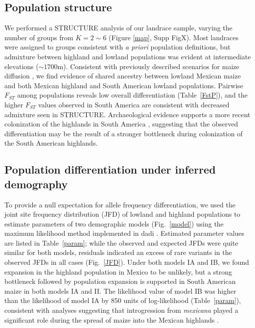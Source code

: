 \subsection*{Population structure}

We performed a {\sf STRUCTURE} analysis \citep{Pritchard_2000_10835412,Falush_2003_12930761} of our landrace sample, varying the number of groups from $K=2\sim 6$ (Figure \ref{map}, Supp FigX). 
Most landraces were assigned to groups consistent with \emph{a priori} population definitions, but admixture between highland and lowland populations was evident at intermediate elevations ($\sim1700$m).  Consistent with previously described scenarios for maize diffusion \citep{Piperno_2006_69}, we find evidence of shared ancestry between lowland Mexican maize and both Mexican highland and South American lowland populations.  Pairwise $F_{ST}$ among populations reveals low overall differentiation (Table~\ref{FstP}), and the higher $F_{ST}$ values observed in South America are consistent with decreased admixture seen in STRUCTURE.  Archaeological evidence supports a more recent colonization of the highlands in South America  \citep{Piperno_2006_69,Perry_2006_16511492,Grobman_2012_22307642}, suggesting that the observed differentiation may be the result of a stronger  bottleneck during colonization of the South American highlands. 

\subsection*{Population differentiation under inferred demography}

To provide a null expectation for allele frequency differentiation, we used the joint site frequency distribution (JFD) of lowland and highland populations to estimate parameters of two demographic models (Fig.~\ref{model}) using the maximum likelihood method implemented in {\sf dadi} \citep{Gutenkunst_2009_19851460}.  
Estimated parameter values are listed in Table~\ref{param}; 
while the observed and expected JFDs were quite similar for both models,  
residuals indicated an excess of rare variants in the observed JFDs in all cases (Fig.~\ref{JFD}). 
Under both models IA and IB,  we found expansion in the highland population in Mexico to be unlikely, but a strong bottleneck followed by population expansion is supported in South American maize in both models IA and II.  
The likelihood value of model IB was higher than the likelihood of model IA by 850 units of log-likelihood (Table~\ref{param}), 
consistent with analyses suggesting that introgression from \textit{mexicana} played a significant role during the spread of maize into the Mexican highlands \citep{Profford_2013}. 

